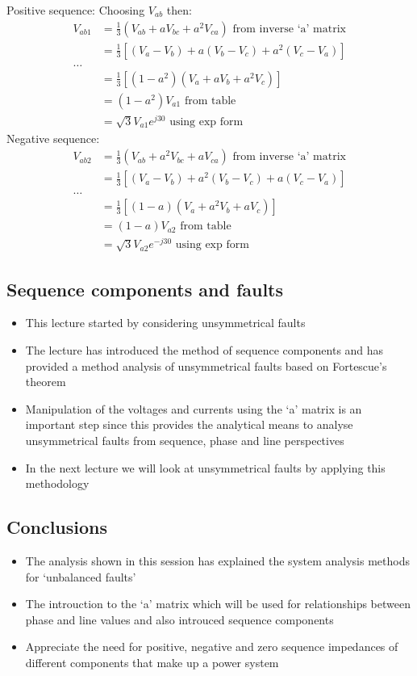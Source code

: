 \documentclass[class=report, crop=false, 12pt,a4paper]{standalone}
\begin{document}
Positive sequence:
Choosing $V_{ab}$ then:
\begin{align}
	V_{ab1} &= \frac{1}{3}\left(V_{ab} + aV_{bc} + a^2 V_{ca}\right) \textrm{ from inverse `a' matrix}\\
	&= \frac{1}{3}\left[\left(V_a - V_b\right) + a\left(V_b- V_c\right)+a^2 \left(V_c - V_a\right)\right]\\
	\dots\\
	&= \frac{1}{3}\left[\left(1-a^2\right)\left(V_a + aV_b + a^2 V_c\right)\right]\\
	&= \left(1-a^2\right)V_{a1} \textrm{ from table}\\
	&= \sqrt{3} V_{a1} e^{j30} \textrm{ using exp form}
\end{align}
Negative sequence:
\begin{align}
	V_{ab2} &= \frac{1}{3}\left(V_{ab} + a^2V_{bc} + a V_{ca}\right) \textrm{ from inverse `a' matrix}\\
	&= \frac{1}{3}\left[\left(V_a - V_b\right) + a^2\left(V_b- V_c\right)+a \left(V_c - V_a\right)\right]\\
	\dots\\
	&= \frac{1}{3}\left[\left(1-a\right)\left(V_a + a^2V_b + a V_c\right)\right]\\
	&= \left(1-a\right)V_{a2} \textrm{ from table}\\
	&= \sqrt{3} V_{a2} e^{-j30} \textrm{ using exp form}
\end{align}
\subsection{Sequence components and faults}
\begin{itemize}
	\item This lecture started by considering unsymmetrical faults
	\item The lecture has introduced the method of sequence components and has provided a method analysis of unsymmetrical faults based on Fortescue's theorem
	\item Manipulation of the voltages and currents using the `a' matrix is an important step since this provides the analytical means to analyse unsymmetrical faults from sequence, phase and line perspectives
	\item In the next lecture we will look at unsymmetrical faults by applying this methodology
\end{itemize}
\subsection{Conclusions}
\begin{itemize}
	\item The analysis shown in this session has explained the system analysis methods for `unbalanced faults'
	\item The introuction to the `a' matrix which will be used for relationships between phase and line values and also introuced sequence components
	\item Appreciate the need for positive, negative and zero sequence impedances of different components that make up a power system
\end{itemize}
\end{document}
